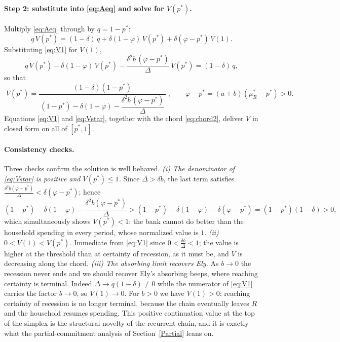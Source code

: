 \documentclass[12pt]{article}
\begin{document}
\paragraph{Step 2: substitute into \eqref{eq:Aeq} and solve for $V(p^*)$.}
Multiply \eqref{eq:Aeq} through by $q = 1-p^*$:
\[
q\,V(p^*) = (1-\delta)\,q + \delta(1-\varphi)\,V(p^*) + \delta(\varphi-p^*)\,V(1).
\]
Substituting \eqref{eq:V1} for $V(1)$,
\[
q\,V(p^*) - \delta(1-\varphi)\,V(p^*) - \frac{\delta^2 b\,(\varphi-p^*)}{\Delta}\,V(p^*) = (1-\delta)\,q,
\]
so that
\begin{equation}\label{eq:Vstar}
\boxed{\;V(p^*) = \frac{(1-\delta)(1-p^*)}{\,(1-p^*) - \delta(1-\varphi) - \dfrac{\delta^2 b\,(\varphi-p^*)}{\Delta}\,}\;},
\qquad \varphi - p^* = (a+b)(\mu_R^*-p^*) > 0 .
\end{equation}
Equations \eqref{eq:V1} and \eqref{eq:Vstar}, together with the chord \eqref{eq:chord2}, deliver $V$ in closed form on all of $[p^*,1]$.

\paragraph{Consistency checks.} Three checks confirm the solution is well behaved.
\emph{(i) The denominator of \eqref{eq:Vstar} is positive and $V(p^*)\le 1$.} Since $\Delta > \delta b$, the last term satisfies $\tfrac{\delta^2 b(\varphi-p^*)}{\Delta} < \delta(\varphi-p^*)$; hence
\[
(1-p^*) - \delta(1-\varphi) - \frac{\delta^2 b(\varphi-p^*)}{\Delta}
> (1-p^*) - \delta(1-\varphi) - \delta(\varphi-p^*)
= (1-p^*)(1-\delta) > 0,
\]
which simultaneously shows $V(p^*) < 1$: the bank cannot do better than the household spending in every period, whose normalized value is $1$.
\emph{(ii) $0 < V(1) < V(p^*)$.} Immediate from \eqref{eq:V1} since $0 < \tfrac{\delta b}{\Delta} < 1$; the value is higher at the threshold than at certainty of recession, as it must be, and $V$ is decreasing along the chord.
\emph{(iii) The absorbing limit recovers Ely.} As $b\to 0$ the recession never ends and we should recover Ely's absorbing beeps, where reaching certainty is terminal. Indeed $\Delta \to q(1-\delta) \ne 0$ while the numerator of \eqref{eq:V1} carries the factor $b\to 0$, so $V(1)\to 0$. For $b>0$ we have $V(1)>0$: reaching certainty of recession is no longer terminal, because the chain eventually leaves $R$ and the household resumes spending. This positive continuation value at the top of the simplex is the structural novelty of the recurrent chain, and it is exactly what the partial-commitment analysis of Section~\ref{Partial} leans on.
\end{document}
